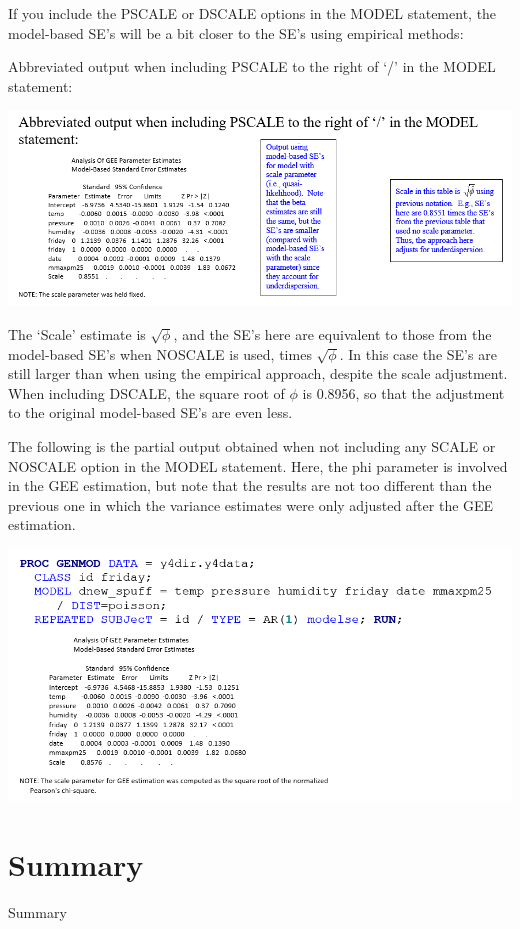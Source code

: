\documentclass[
  9pt,
  ignorenonframetext,
]{beamer}
\begin{document}
\begin{frame}{}
\protect\hypertarget{section-9}{}
If you include the PSCALE or DSCALE options in the MODEL statement, the
model-based SE's will be a bit closer to the SE's using empirical
methods:

Abbreviated output when including PSCALE to the right of `/' in the
MODEL statement:

\begin{center}\includegraphics[width=0.8\linewidth]{figs_L14/f5} \end{center}

The `Scale' estimate is \(\sqrt \phi\), and the SE's here are equivalent
to those from the model-based SE's when NOSCALE is used, times
\(\sqrt \phi\). In this case the SE's are still larger than when using
the empirical approach, despite the scale adjustment. When including
DSCALE, the square root of \(\phi\) is 0.8956, so that the adjustment to
the original model-based SE's are even less.
\end{frame}

\begin{frame}{}
\protect\hypertarget{section-10}{}
The following is the partial output obtained when not including any
SCALE or NOSCALE option in the MODEL statement. Here, the phi parameter
is involved in the GEE estimation, but note that the results are not too
different than the previous one in which the variance estimates were
only adjusted after the GEE estimation.

\begin{center}\includegraphics[width=0.8\linewidth]{figs_L14/f6} \end{center}
\end{frame}

\hypertarget{summary}{%
\section{Summary}\label{summary}}

\begin{frame}{Summary}
\protect\hypertarget{summary-1}{}
\end{frame}
\end{document}
